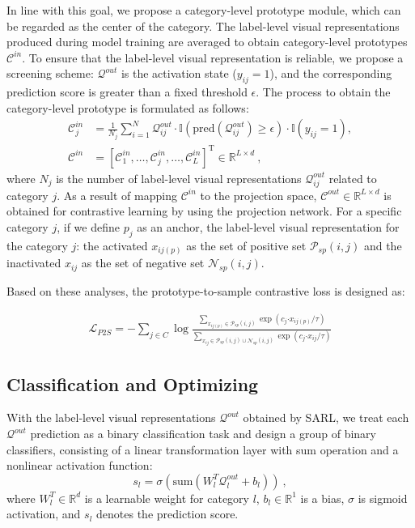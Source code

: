 \documentclass{ecai}
\newcommand{\bcdot}{\boldsymbol{\cdot}}
\begin{document}
In line with this goal, we propose a category-level prototype module, which can be regarded as the center of the category.
The label-level visual representations produced during model training are averaged to obtain category-level prototypes $\mathcal{C}^{in} $. 
To ensure that the label-level visual representation is reliable, we propose a screening scheme: $\mathcal{Q}^{out}$ is the activation state ($y_{ij}=1$), and the corresponding prediction score is greater than a fixed threshold $\epsilon$. 
The process to obtain the category-level prototype is formulated as follows:
\begin{equation}
\label{eq:prototype}
	\begin{split}
		\mathcal{C}^{in}_j &= \frac{1}{N_j} \sum\limits_{i=1}^{N}\mathcal{Q}^{out}_{ij}\cdot \mathbb{I}(\text{pred}(\mathcal{Q}^{out}_{ij}) \geq \epsilon)\cdot \mathbb{I}(y_{ij}=1),\\ \mathcal{C}^{in} &= [\mathcal{C}^{in}_1,\ldots,\mathcal{C}^{in}_j,\ldots ,\mathcal{C}^{in}_L]^\mathrm{T}\in\mathbb{R}^{L\times d}~,
	\end{split}
\end{equation}
where ${N_j}$ is the number of label-level visual representations $\mathcal{Q}^{out}_{ij}$ related to category $j$.
As a result of mapping $\mathcal{C}^{in}$ to the projection space, $\mathcal{C}^{out}\in \mathbb{R}^{L\times d}$ is obtained for contrastive learning by using the projection network.
For a specific category $j$, if we define $p_j$ as an anchor, the label-level visual representation for the category $j$: the activated $x_{ij(p)}$ as the set of positive set $\mathcal{P}_{sp}(i,j)$ and the inactivated $x_{ij}$ as the set of negative set $\mathcal{N}_{sp}(i,j)$.

Based on these analyses, the prototype-to-sample contrastive loss is designed as:

\begin{align}
	\label{eq:pscl}
	\mathcal{L}_{P2S} = -\sum\limits_{j \in C} \log \frac{\sum\limits_{x_{ij(p)} \in \mathcal{P}_{sp}(i,j)} \exp( c_j \bcdot x_{ij(p)}/\tau)}{\sum\limits_{x_{ij} \in \mathcal{P}_{sp}(i,j) \cup \mathcal{N}_{sp}(i,j)  }  \exp( c_j \bcdot x_{ij}/\tau)}
\end{align}

\subsection{Classification and Optimizing}
With the label-level visual representations $\mathcal{Q}^{out}$ obtained by SARL, we treat each $\mathcal{Q}^{out}$ prediction as a binary classification task and design a group of binary classifiers, consisting of a linear transformation layer with sum operation and a nonlinear activation function:
\begin{equation}
	s_l =  \sigma \left( \text{sum}\left(W_l^T \mathcal{Q}^{out}_{l}+b_l \right) \right)~,
	\label{eq:cls}
\end{equation}
where $W_l^T \in\mathbb{R}^{d}$ is a learnable weight for category $l$, $b_l\in\mathbb{R}^1$ is a bias, $\sigma$ is sigmoid activation, 
and $s_l$ denotes the prediction score.
\end{document}
